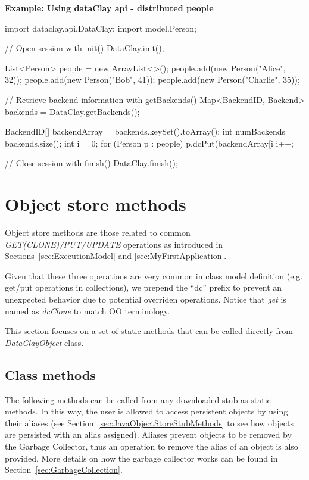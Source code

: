 \begin{tBox}
\textcolor{basecolor} {\bf Example: Using dataClay api - distributed people}
\begin{java}
import dataclay.api.DataClay;
import model.Person;

// Open session with init()
DataClay.init();

List<Person> people = new ArrayList<>();
people.add(new Person("Alice", 32));
people.add(new Person("Bob", 41));
people.add(new Person("Charlie", 35));

// Retrieve backend information with getBackends()
Map<BackendID, Backend> backends = DataClay.getBackends();

BackendID[] backendArray = backends.keySet().toArray();
int numBackends = backends.size();
int i = 0;
for (Person p : people) {
  p.dcPut(backendArray[i %
  i++;
}

// Close session with finish()
DataClay.finish();
\end{java}
\end{tBox}


\section{Object store methods}
\label{sec:JavaObjectStore}

Object store methods are those related to common \textit{GET(CLONE)/PUT/UPDATE} operations as introduced in Sections~\ref{sec:ExecutionModel} and \ref{sec:MyFirstApplication}.

Given that these three operations are very common in class model definition (e.g. get/put operations in collections), we prepend the ``dc'' prefix to prevent an unexpected behavior due to potential overriden operations. Notice that \textit{get} is named as \textit{dcClone} to match OO terminology.

This section focuses on a set of static methods that can be called directly from \textit{DataClayObject} class.



\subsection{Class methods}
\label{sec:JavaClassMethodsObjectStore}

The following methods can be called from any downloaded stub as static methods. In this way, the user is allowed to access persistent objects by using their aliases (see Section~\ref{sec:JavaObjectStoreStubMethods} to see how objects are persisted with an alias assigned). Aliases prevent objects to be removed by the Garbage Collector, thus an operation to remove the alias of an object is also provided. More details on how the garbage collector works can be found in Section~\ref{sec:GarbageCollection}. 

